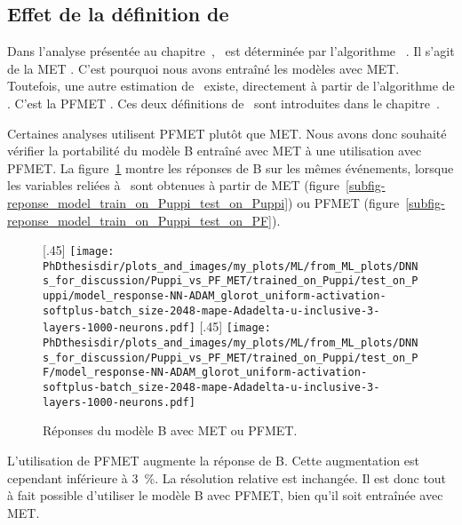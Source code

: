 \subsection{Effet de la définition de \MET}
\def\Bpf{$\text{B}^\text{PF}$}
Dans l'analyse présentée au chapitre~,
\MET\ est déterminée par l'algorithme \PUPPI~\cite{PUPPI}.
Il s'agit de la \og \PUPPI MET \fg.
C'est pourquoi nous avons entraîné les modèles avec \PUPPI MET.
Toutefois, une autre estimation de \MET\ existe, directement à partir de l'algorithme de \PF.
C'est la \og PFMET \fg.
Ces deux définitions de \MET\ sont introduites dans le chapitre~.
\par
Certaines analyses utilisent PFMET plutôt que \PUPPI MET.
Nous avons donc souhaité vérifier la portabilité du modèle B
entraîné avec \PUPPI MET à une utilisation avec PFMET.
La figure~\ref{fig-MET-PF-PUPPI-B} montre les réponses de B
sur les mêmes événements,
lorsque les variables reliées à \MET\ sont obtenues à partir de
\PUPPI MET (figure~\ref{subfig-reponse_model_train_on_Puppi_test_on_Puppi})
ou
PFMET (figure~\ref{subfig-reponse_model_train_on_Puppi_test_on_PF}).
\begin{figure}[h]
\centering

[.45\textwidth]
{\texttt{[image: \\PhDthesisdir/plots\_and\_images/my\_plots/ML/from\_ML\_plots/DNNs\_for\_discussion/Puppi\_vs\_PF\_MET/trained\_on\_Puppi/test\_on\_Puppi/model\_response-NN-ADAM\_glorot\_uniform-activation-softplus-batch\_size-2048-mape-Adadelta-u-inclusive-3-layers-1000-neurons.pdf]}\vspace{-.5\baselineskip}}
\hfill
{}[.45\textwidth]
{\texttt{[image: \\PhDthesisdir/plots\_and\_images/my\_plots/ML/from\_ML\_plots/DNNs\_for\_discussion/Puppi\_vs\_PF\_MET/trained\_on\_Puppi/test\_on\_PF/model\_response-NN-ADAM\_glorot\_uniform-activation-softplus-batch\_size-2048-mape-Adadelta-u-inclusive-3-layers-1000-neurons.pdf]}\vspace{-.5\baselineskip}}

\caption{Réponses du modèle B avec \PUPPI MET ou PFMET.}
\label{fig-MET-PF-PUPPI-B}
\end{figure}
\par
L'utilisation de PFMET augmente la réponse de B.
Cette augmentation est cependant inférieure à \SI{3}{\%}.
La résolution relative est inchangée.
Il est donc tout à fait possible d'utiliser le modèle B avec PFMET, bien qu'il soit entraînée avec \PUPPI MET.
